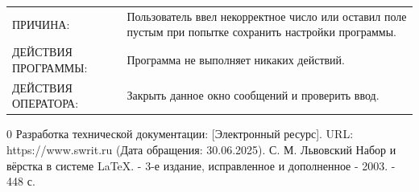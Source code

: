 \documentclass[14pt,a4paper,final]{extreport}
\begin{document}
\begin{center}
	\centering
	\begin{tabularx}{.85\textwidth}{>{\hsize=0.4\textwidth}X>{\hsize=0.4\textwidth}X}
		ПРИЧИНА: & Пользователь ввел некорректное число или	оставил поле пустым при попытке сохранить настройки программы. \\
		ДЕЙСТВИЯ ПРОГРАММЫ: & Программа не выполняет никаких действий. \\
		ДЕЙСТВИЯ ОПЕРАТОРА: &  Закрыть данное окно сообщений и проверить ввод. \\
	\end{tabularx}
\end{center}

\pagebreak

\fancyhead[C]{\bfseries\thepage\\\docstamp}  %

\begin{thebibliography}{0}
	 Разработка технической документации: [Электронный ресурс]. URL:
	https://www.swrit.ru (Дата обращения: 30.06.2025).
	 С. М. Львовский Набор и вёрстка в системе \LaTeX. - 3-е издание, исправленное и дополненное - 2003. - 448 с.
\end{thebibliography}
\pagebreak

\label{lastpage}
\end{document}
